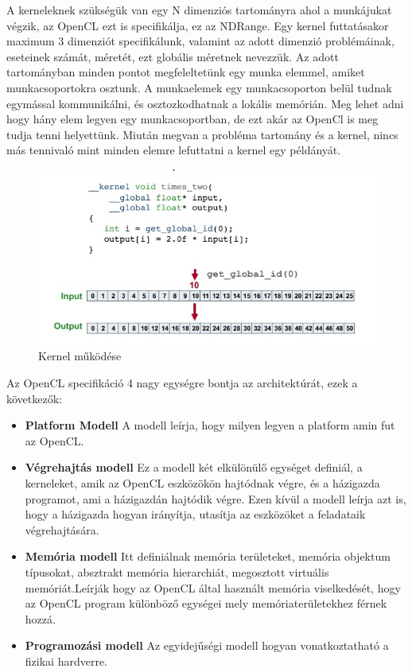  A kerneleknek szükségük van egy N dimenziós tartományra ahol a munkájukat végzik, az OpenCL  ezt is specifikálja, ez az NDRange. Egy kernel futtatásakor maximum 3 dimenziót specifikálunk, valamint az adott dimenzió problémáinak, eseteinek számát, méretét, ezt globális méretnek nevezzük. Az adott tartományban minden pontot megfeleltetünk egy munka elemmel, amiket munkacsoportokra osztunk. A munkaelemek egy munkacsoporton belül tudnak egymással kommunikálni, és osztozkodhatnak a lokális memórián. Meg lehet adni hogy hány elem legyen egy munkacsoportban, de ezt akár az OpenCl is meg tudja tenni helyettünk. Miután megvan a probléma tartomány és a  kernel, nincs más tennivaló mint minden elemre lefuttatni a kernel egy példányát.
 
\begin{figure}[h]
\centering
\includegraphics[scale=0.7]{images/kernel.jpg}
\caption{Kernel működése}
\label{fig:kernel}
\end{figure}

Az OpenCL specifikáció 4 nagy egységre bontja az architektúrát, ezek a következők:
\begin{itemize}
\item \textbf{Platform Modell} A modell leírja, hogy milyen legyen a platform amin fut az OpenCL. 
\item \textbf{Végrehajtás modell} Ez a modell két elkülönülő egységet definiál, a kerneleket, amik az OpenCL eszközökön hajtódnak végre, és a házigazda programot, ami a házigazdán hajtódik végre. Ezen kívül a modell leírja azt is, hogy a házigazda hogyan irányítja, utasítja az eszközöket a feladataik végrehajtására.
\item \textbf{Memória modell} Itt definiálnak memória területeket,  memória objektum típusokat, absztrakt memória hierarchiát, megosztott virtuális memóriát.Leírják hogy az OpenCL által használt memória viselkedését, hogy az OpenCL program különböző egységei mely memóriaterületekhez férnek hozzá.
\item \textbf{Programozási modell} Az egyidejűségi modell hogyan vonatkoztatható a fizikai hardverre.

\end{itemize}

